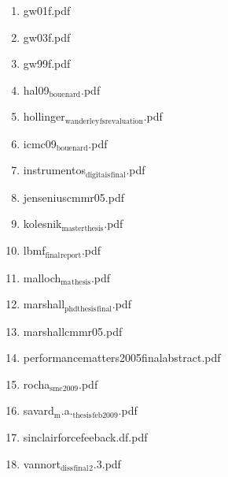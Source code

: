 \documentclass[11pt]{article}
\begin{document}
\begin{enumerate}
\begin{enumerate}
\item gw01f.pdf
\label{sec-1-1-1-1-15-7-3-11}

\item gw03f.pdf
\label{sec-1-1-1-1-15-7-3-12}

\item gw99f.pdf
\label{sec-1-1-1-1-15-7-3-13}

\item hal09$_{\text{bouenard}}$.pdf
\label{sec-1-1-1-1-15-7-3-14}

\item hollinger$_{\text{wanderley}}$$_{\text{fsrevaluation}}$.pdf
\label{sec-1-1-1-1-15-7-3-15}

\item icmc09$_{\text{bouenard}}$.pdf
\label{sec-1-1-1-1-15-7-3-16}

\item instrumentos$_{\text{digitais}}$$_{\text{final}}$.pdf
\label{sec-1-1-1-1-15-7-3-17}

\item jenseniuscmmr05.pdf
\label{sec-1-1-1-1-15-7-3-18}

\item kolesnik$_{\text{masterthesis}}$.pdf
\label{sec-1-1-1-1-15-7-3-19}

\item lbmf$_{\text{final}}$$_{\text{report}}$.pdf
\label{sec-1-1-1-1-15-7-3-20}

\item malloch$_{\text{ma}}$$_{\text{thesis}}$.pdf
\label{sec-1-1-1-1-15-7-3-21}

\item marshall$_{\text{phdthesis}}$$_{\text{final}}$.pdf
\label{sec-1-1-1-1-15-7-3-22}

\item marshallcmmr05.pdf
\label{sec-1-1-1-1-15-7-3-23}

\item performancematters2005finalabstract.pdf
\label{sec-1-1-1-1-15-7-3-24}

\item rocha$_{\text{smc2009}}$.pdf
\label{sec-1-1-1-1-15-7-3-25}

\item savard$_{\text{m}}$.a.$_{\text{thesis}}$$_{\text{feb2009}}$.pdf
\label{sec-1-1-1-1-15-7-3-26}

\item sinclairforcefeeback.df.pdf
\label{sec-1-1-1-1-15-7-3-27}

\item vannort$_{\text{diss}}$$_{\text{final}}$$_{\text{2}}$.3.pdf
\label{sec-1-1-1-1-15-7-3-28}


\end{enumerate}
\end{enumerate}
\end{document}
